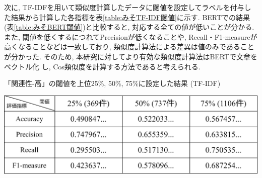 \documentclass{ltjarticle}
\begin{document}
次に, TF-IDFを用いて類似度計算したデータに閾値を設定してラベルを付与した結果から計算した各指標を表\ref{table:みそTF-IDF閾値}に示す. 
BERTでの結果(表\ref{table:みそBERT閾値})と比較すると, 対応する全ての値が低いことが分かる. 
また, 閾値を低くするにつれてPrecisionが低くなることや, Recall・F1-measureが高くなることなどは一致しており, 
類似度計算法による差異は値のみであることが分かった. そのため, 本研究に対してより有効な類似度計算法はBERTで文章をベクトル化
し, Cos類似度を計算する方法であると考えられる. 

\vspace{10truept}

\begin{table}[h]
    \centering
    \caption{「関連性-高」の閾値を上位25\%, 50\%, 75\%に設定した結果 (TF-IDF)}
    \vspace{5truept}

    \includegraphics[width = 14cm]{images/TF-IDF閾値.drawio.png}
    \label{table:みそTF-IDF閾値}
\end{table}
\end{document}

